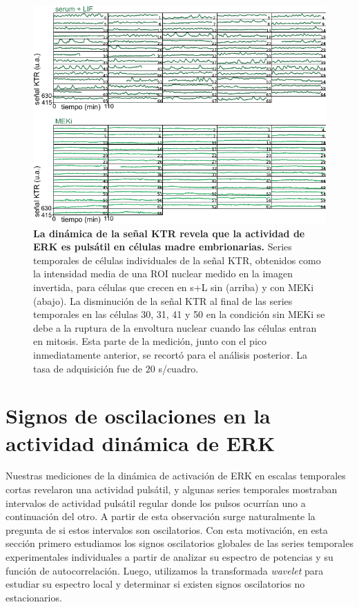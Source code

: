 \documentclass[./main.tex]{subfiles}
\begin{document}
\begin{figure}
    \centering
    \includegraphics[width=1\columnwidth]{figures/chapter2/C2_traces.pdf} 
    \caption{\textbf{La dinámica de la señal KTR revela que la actividad de ERK es pulsátil en células madre embrionarias.} Series temporales de células individuales de la señal KTR, obtenidos como la intensidad media de una ROI nuclear medido en la imagen invertida, para células que crecen en s+L sin (arriba) y con MEKi (abajo). La disminución de la señal KTR al final de las series temporales en las células 30, 31, 41 y 50 en la condición sin MEKi se debe a la ruptura de la envoltura nuclear cuando las células entran en mitosis. Esta parte de la medición, junto con el pico inmediatamente anterior, se recortó para el análisis posterior. La tasa de adquisición fue de $20$ s/cuadro.}
    \label{C2_fig:traces}
\end{figure}




\section{Signos de oscilaciones en la actividad dinámica de ERK}
\label{C2_sec:oscilaciones}

Nuestras mediciones de la dinámica de activación de ERK en escalas temporales cortas revelaron una actividad pulsátil, y algunas series temporales mostraban intervalos de actividad pulsátil regular donde los pulsos ocurrían uno a continuación del otro. A partir de esta observación surge naturalmente la pregunta de si estos intervalos son oscilatorios. Con esta motivación, en esta sección primero estudiamos los signos oscilatorios globales de las series temporales experimentales individuales a partir de analizar su espectro de potencias y su función de autocorrelación. Luego, utilizamos la transformada \textit{wavelet} para estudiar su espectro local y determinar si existen signos oscilatorios no estacionarios. 
\end{document}
